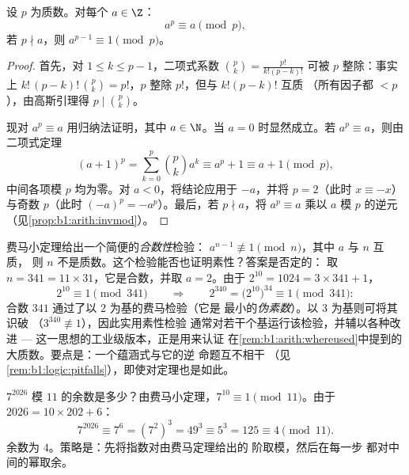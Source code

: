 \begin{theorem}[费马小定理]\label{thm:b1:arith:fermat}
设 $p$ 为质数。对每个 $a \in \Z$：
\[
a^p \equiv a \pmod p,
\]
若 $p \nmid a$，则 $a^{p-1} \equiv 1 \pmod
p$。
\end{theorem}

\begin{proof}
首先，对 $1 \leq k \leq p - 1$，二项式系数 $\binom pk
= \frac{p!}{k!(p-k)!}$ 可被 $p$ 整除：事实上 $k!\,(p-k)!\,
\binom pk = p!$，$p$ 整除 $p!$，但与 $k!(p-k)!$ 互质
（所有因子都 $< p$），由高斯引理得 $p \mid \binom pk$。

现对 $a^p \equiv a$ 用归纳法证明，其中 $a \in \N$。当 $a =
0$ 时显然成立。若 $a^p \equiv a$，则由二项式定理
\[
(a+1)^p = \sum_{k=0}^{p} \binom pk a^k
\equiv a^p + 1 \equiv a + 1 \pmod p,
\]
中间各项模 $p$ 均为零。对 $a < 0$，将结论应用于
$-a$，并将 $p = 2$（此时 $x \equiv -x$）与奇数 $p$（此时
$(-a)^p = -a^p$）。最后，若 $p \nmid a$，将 $a^p \equiv a$ 乘以
$a$ 模 $p$ 的逆元（见\cref{prop:b1:arith:invmod}）。
\end{proof}

\begin{example}[费马小定理的逆不成立：$341$]\label{ex:b1:arith:pseudoprime}
费马小定理给出一个简便的\emph{合数性}检验：
$a^{n-1} \not\equiv 1 \pmod n$，其中 $a$ 与 $n$ 互质，
则 $n$ 不是质数。这个检验能否也证明素性？答案是否定的：
取 $n = 341 = 11 \times 31$，它是合数，并取 $a = 2$。由于
$2^{10} = 1024 = 3 \times 341 + 1$，
\[
2^{10} \equiv 1 \pmod{341}
\qquad\Longrightarrow\qquad
2^{340} = \bigl(2^{10}\bigr)^{34} \equiv 1 \pmod{341} :
\]
合数 $341$ 通过了以 $2$ 为基的费马检验（它是
最小的\emph{伪素数}）。以 $3$ 为基则可将其识破
（$3^{340} \not\equiv 1$），因此实用素性检验
通常对若干个基运行该检验，并辅以各种改进 ---
这一思想的工业级版本，正是用来认证
在\cref{rem:b1:arith:whereused}中提到的大质数。要点是：一个蕴涵式与它的逆
命题互不相干
（见\cref{rem:b1:logic:pitfalls}），即使对定理也是如此。
\end{example}

\begin{example}[同余计算的实例]\label{ex:b1:arith:congruences}
$7^{2026}$ 模 $11$ 的余数是多少？由费马小定理，$7^{10}
\equiv 1 \pmod{11}$。由于 $2026 = 10 \times 202 + 6$：
\[
7^{2026} \equiv 7^6 = (7^2)^3 = 49^3 \equiv 5^3 = 125 \equiv 4
\pmod{11}.
\]
余数为 $4$。策略是：先将指数对由费马定理给出的
阶取模，然后在每一步
都对中间的幂取余。
\end{example}

